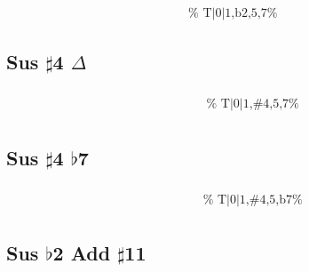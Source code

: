 \documentclass[english]{./gbook}
\begin{document}
\begin{large}
\[\begin{array}{ll}
&
	\text{
	}
\end{array}
\]

\subsection*{Sus $\sharp$4 $\Delta$}

\[
\begin{array}{ll}
	\begin{array}{c}
		\begin{array}{ccc}
			&%
			&%
		\end{array}
		\\
		\begin{array}{cc}
			&%
		\end{array}
	\end{array}

&
	\text{
	}
\end{array}
\]

\subsection*{Sus $\sharp$4 $\flat$7}

\[
\begin{array}{ll}
	\begin{array}{c}
		\begin{array}{ccc}
			&%
			&%
		\end{array}
		\\
		\begin{array}{cc}
			&%
		\end{array}
	\end{array}

&
	\text{
	}
\end{array}
\]

\subsection*{Sus $\flat$2 Add $\sharp$11}

\[
\begin{array}{ll}
	\begin{array}{c}
		\begin{array}{ccc}
			&%
			&%
		\end{array}
		\\
		\begin{array}{cc}
			&%
		\end{array}
	\end{array}


\end{array}\]
\end{large}
\end{document}
